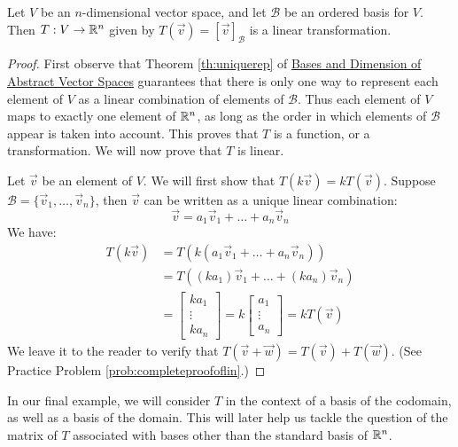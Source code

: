 \documentclass{ximera}
\begin{document}
\begin{theorem}\label{th:coordvectmappinglinear}
Let $V$ be an $n$-dimensional vector space, and let $\mathcal{B}$ be an ordered basis for $V$.  Then  $T:V\rightarrow \mathbb{R}^n$ given by $T(\vec{v})=[\vec{v}]_{\mathcal{B}}$ is a linear transformation.
\end{theorem}
\begin{proof}
First observe that Theorem \ref{th:uniquerep} of \href{https://ximera.osu.edu/linearalgebradzv3/LinearAlgebraInteractiveIntro/VSP-0060/main}{Bases and Dimension of Abstract Vector Spaces} guarantees that there is only one way to represent each element of $V$ as a linear combination of elements of $\mathcal{B}$.  Thus each element of $V$ maps to exactly one element of $\mathbb{R}^n$, as long as the order in which elements of $\mathcal{B}$ appear is taken into account.  This proves that $T$ is a function, or a transformation.  We will now prove that $T$ is linear.

Let $\vec{v}$ be an element of $V$.  We will first show that $T(k\vec{v})=kT(\vec{v})$.  Suppose $\mathcal{B}=\{\vec{v}_1, \ldots ,\vec{v}_n\}$, then $\vec{v}$ can be written as a unique linear combination:
$$\vec{v}=a_1\vec{v}_1+ \ldots +a_n\vec{v}_n$$
We have:
\begin{align*}
    T(k\vec{v})&=T(k(a_1\vec{v}_1+ \ldots +a_n\vec{v}_n))\\
    &=T((ka_1)\vec{v}_1+ \ldots +(ka_n)\vec{v}_n)\\
    &=\begin{bmatrix}ka_1\\\vdots\\ka_n\end{bmatrix}=k\begin{bmatrix}a_1\\\vdots\\a_n\end{bmatrix}=kT(\vec{v})
\end{align*}
We leave it to the reader to verify that $T(\vec{v}+\vec{w})=T(\vec{v})+T(\vec{w})$.  (See Practice Problem \ref{prob:completeproofoflin}.)
\end{proof}

In our final example, we will consider $T$ in the context of a basis of the codomain, as well as a basis of the domain.  This will later help us tackle the question of the matrix of $T$ associated with bases other than the standard basis of $\mathbb{R}^n$.
\end{document}
